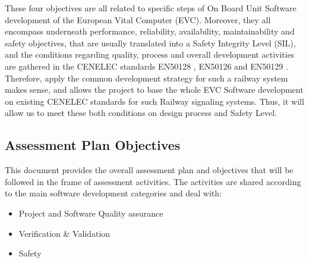 \documentclass[openetcs]{template/openetcs_article}
\begin{document}
These four objectives are all related to specific steps of On Board Unit Software development of the European Vital Computer (EVC). Moreover, they all encompass
underneath performance, reliability, availability, maintainability and safety objectives, that are usually translated into a Safety Integrity Level (SIL), and
the conditions regarding quality, process and overall development activities are gathered in the CENELEC standards EN50128 \cite{EN50128}, EN50126
\cite{EN50126} and EN50129 \cite{EN50129}.
Therefore, apply the common development strategy for such a railway system makes sense, and allows the project to base the whole EVC Software development on
existing CENELEC standards for such Railway signaling systems. Thus, it will allow us to meet these both conditions on design process and Safety Level.

\subsection{Assessment Plan Objectives}
This document provides the overall assessment plan and objectives that will be followed in the frame of assessment activities.
The activities are shared according to the main software development categories and deal with:
\begin{itemize}
\item Project and Software Quality assurance
\item Verification \& Validation
\item Safety
\end{itemize}
\end{document}
